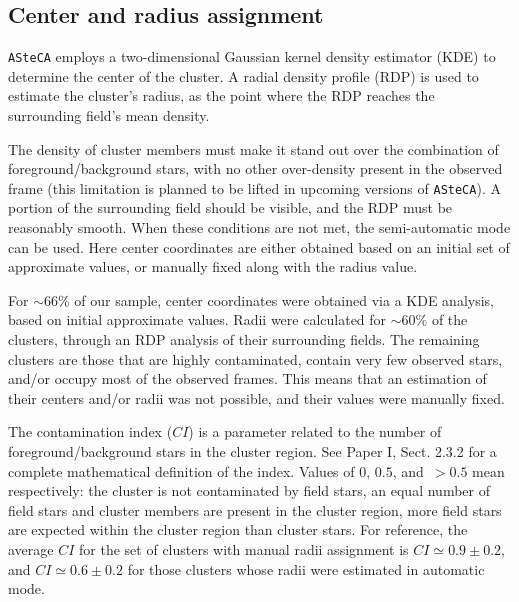 \documentclass[draft]{aa}
\begin{document}

\subsection{Center and radius assignment}
\label{ssec:centre-radius}

\texttt{ASteCA} employs a two-dimensional Gaussian kernel density estimator 
(KDE) to determine the center of the cluster. A radial density profile (RDP) is
used to estimate the cluster's radius, as the point where the RDP reaches the
surrounding field's mean density.

The density of cluster members must make it stand out over the combination of
foreground/background stars, with no other over-density present in the observed
frame (this limitation is planned to be lifted in upcoming versions of
\texttt{ASteCA}). A portion of the surrounding field should be visible, and the
RDP must be reasonably smooth.
%
When these conditions are not met, the semi-automatic mode can be used. Here
center coordinates are either obtained based on an initial set of approximate
values, or manually fixed along with the radius value.

For ${\sim}66\%$ of our sample, center coordinates were obtained via a KDE
analysis, based on initial approximate values. Radii were calculated for
${\sim}60\%$ of the clusters, through an RDP analysis of their surrounding
fields.
%
The remaining clusters are those that are highly contaminated, contain very few
observed stars, and/or occupy most of the observed frames. This means that an
estimation of their centers and/or radii was not possible, and their values
were manually fixed.

The contamination index ($CI$) is a parameter related to the number of
foreground/background stars in the cluster region. See Paper
I, Sect. 2.3.2 for a complete mathematical definition of the index.
Values of $0,\,0.5$, and $\,{>}0.5$ mean respectively: the cluster is not
contaminated by field stars, an equal number of field stars and cluster
members are present in the cluster region, more field stars are
expected within the cluster region than cluster stars.
%
For reference, the average $CI$ for the set of clusters with manual radii
assignment is $CI{\simeq}0.9{\pm}0.2$, and $CI{\simeq}0.6\pm0.2$ for those
clusters whose radii were estimated in automatic mode.
\end{document}
